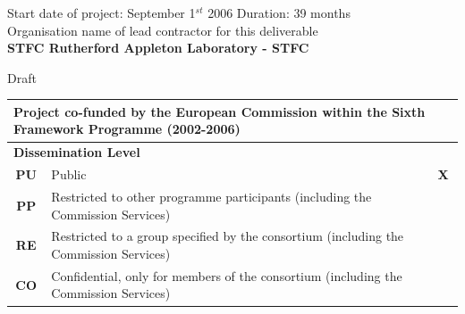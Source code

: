 \documentclass[a4paper,11pt]{article}
\begin{document}
\vspace*{\baselineskip}\noindent
{Start date of project: September 1$^{st}$} 2006 \hfill {Duration: 39 months}\\

\vspace{2\baselineskip}\noindent
Organisation name of lead contractor for this deliverable\\
{\bf STFC Rutherford Appleton Laboratory - STFC}
\begin{flushright} 
Draft
\end{flushright}

\vspace{\baselineskip}
\begin{table}[hb]
\begin{tabular}{||c|l|l||} \hline\hline
\multicolumn{3}{||l||}{\small Project co-funded by the European Commission within the Sixth Framework Programme (2002-2006)}\\ \hline
\multicolumn{3}{||l||}{\bf Dissemination Level}\\ \hline
\bf PU &\small Public\hfill~& \bf X \\ \hline
\bf PP &\small Restricted to other programme participants (including the Commission Services)& \\ \hline 
\bf RE &\small Restricted to a group specified by the consortium (including the Commission Services)&  \\ \hline
\bf CO &\small Confidential, only for members of the consortium (including the Commission Services)&  \\ \hline \hline
\end{tabular}
\end{table}
\pagebreak

\tableofcontents
\pagebreak
\end{document}

